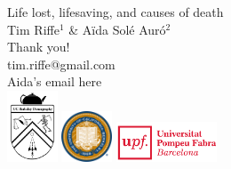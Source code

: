 \documentclass{beamer}
\begin{document}
\begin{frame}[plain]

\vspace{3em}
\LARGE Life lost, lifesaving, and causes of death\\
\vspace{3 mm}
\normalsize Tim Riffe$^1$ \& A{\"i}da Sol\'{e} Aur\'{o}$^2$\\
\vspace{10 mm}
Thank you!\\
\vspace{3mm}
tim.riffe@gmail.com\\
Aida's email here \\ 
  \vspace{15 mm}
  \includegraphics[width=1.5cm]{Figures/demogcrest}\hspace{.5cm}
  \includegraphics[width=1.5cm]{Figures/ucbseal1}\hspace{3cm}
  \includegraphics[height=1.2cm]{Figures/UPFcmyk}
\end{frame}
\end{document}
